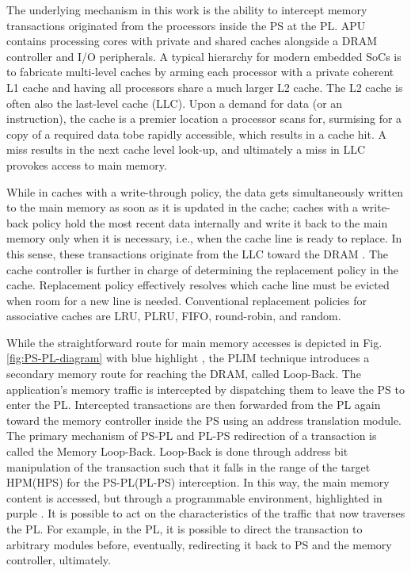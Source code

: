 The underlying mechanism in this work is the ability to intercept
memory transactions originated from the processors inside the PS at
the PL. APU contains processing cores with private and shared caches
alongside a DRAM controller and I/O peripherals. A typical hierarchy
for modern embedded SoCs is to fabricate multi-level caches by arming
each processor with a private coherent L1 cache and having all
processors share a much larger L2 cache. The L2 cache is often also
the last-level cache (LLC). Upon a demand for data (or an
instruction), the cache is a premier location a processor scans for,
surmising for a copy of a required data tobe rapidly accessible, which
results in a cache hit. A miss results in the next cache level
look-up, and ultimately a miss in LLC provokes access to main memory.

While in caches with a write-through policy, the data gets
simultaneously written to the main memory as soon as it is updated in
the cache; caches with a write-back policy hold the most recent data
internally and write it back to the main memory only when it is
necessary, i.e., when the cache line is ready to replace. In this
sense, these transactions originate from the LLC toward the DRAM
. The cache controller is further in charge of determining
the replacement policy in the cache. Replacement policy effectively
resolves which cache line must be evicted when room for a new line is
needed. Conventional replacement policies for associative caches are
LRU, PLRU, FIFO, round-robin, and random.

While the straightforward route for main memory accesses is depicted
in Fig. \ref{fig:PS-PL-diagram} with blue highlight , the
PLIM technique introduces a secondary memory route for reaching the
DRAM, called Loop-Back. The application's memory traffic is
intercepted by dispatching them to leave the PS to enter the
PL. Intercepted transactions are then forwarded from the PL again
toward the memory controller inside the PS using an address
translation module. The primary mechanism of PS-PL and PL-PS
redirection of a transaction is called the Memory Loop-Back. Loop-Back
is done through address bit manipulation of the transaction such that
it falls in the range of the target HPM(HPS) for the PS-PL(PL-PS)
interception. In this way, the main memory content is accessed, but
through a programmable environment, highlighted in purple
. It is possible to act on the characteristics of the
traffic that now traverses the PL. For example, in the PL, it is
possible to direct the transaction to arbitrary modules before,
eventually, redirecting it back to PS and the memory controller,
ultimately.

